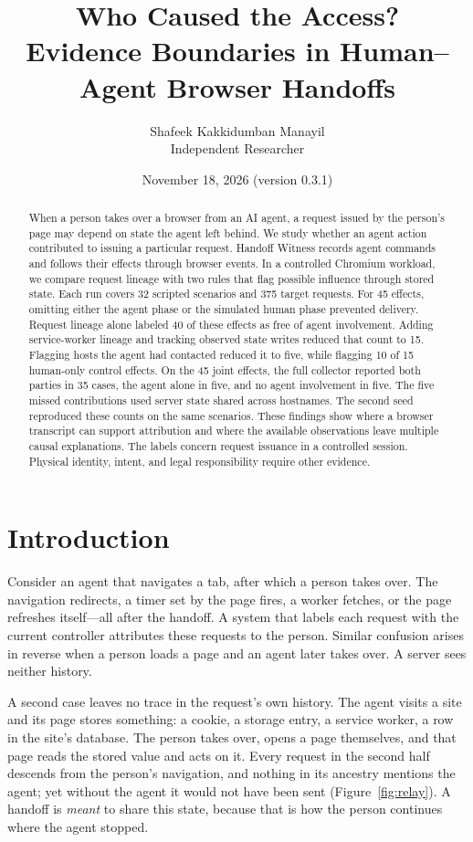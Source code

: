 \documentclass[11pt]{article}
\title{Who Caused the Access?\\Evidence Boundaries in Human--Agent Browser Handoffs}
\author{Shafeek Kakkidumban Manayil\\Independent Researcher}
\date{November 18, 2026 (version 0.3.1)}
\theoremstyle{definition}
\begin{document}
\maketitle
\begin{abstract}
When a person takes over a browser from an AI agent, a request issued by the person's
page may depend on state the agent left behind. We study whether an agent action
contributed to issuing a particular request. Handoff Witness records agent commands and
follows their effects through browser events. In a controlled Chromium workload, we
compare request lineage with two rules that flag possible influence through stored
state. Each run covers 32 scripted scenarios and 375 target requests. For 45 effects,
omitting either the agent phase or the simulated human phase prevented delivery. Request
lineage alone labeled 40 of these effects as free of agent involvement. Adding
service-worker lineage and tracking observed state writes reduced that count to 15.
Flagging hosts the agent had contacted reduced it to five, while flagging 10 of 15
human-only control effects. On the 45 joint effects, the full collector reported both
parties in 35 cases, the agent alone in five, and no agent involvement in five. The five
missed contributions used server state shared across hostnames. The second seed
reproduced these counts on the same scenarios. These findings show where a browser
transcript can support attribution and where the available observations leave multiple
causal explanations. The labels concern request issuance in a controlled session.
Physical identity, intent, and legal responsibility require other evidence.
\end{abstract}

\section{Introduction}
Consider an agent that navigates a tab, after which a person takes over. The
navigation redirects, a timer set by the page fires, a worker fetches, or the
page refreshes itself---all after the handoff. A system that labels each request
with the current controller attributes these requests to the person. Similar
confusion arises in reverse when a person loads a page and an agent later takes
over. A server sees neither history.

A second case leaves no trace in the request's own history. The agent visits a
site and its page stores something: a cookie, a storage entry, a service worker,
a row in the site's database. The person takes over, opens a page themselves, and
that page reads the stored value and acts on it. Every request in the second half
descends from the person's navigation, and nothing in its ancestry mentions the
agent; yet without the agent it would not have been sent
(Figure~\ref{fig:relay}). A handoff is \emph{meant} to share this state, because
that is how the person continues where the agent stopped.
\end{document}
